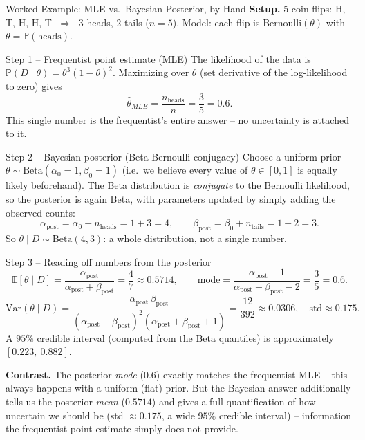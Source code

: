 \documentclass[aspectratio=169,10pt]{beamer}
\begin{document}
\begin{frame}[allowframebreaks]{Worked Example: MLE vs.\ Bayesian Posterior, by Hand}
  \textbf{Setup.} 5 coin flips: H, T, H, H, T $\;\Rightarrow\;$ 3 heads, 2
  tails ($n=5$). Model: each flip is Bernoulli$(\theta)$ with
  $\theta = \mathbb{P}(\text{heads})$.

  \begin{block}{Step 1 -- Frequentist point estimate (MLE)}
    The likelihood of the data is
    $\mathbb{P}(D\mid\theta) = \theta^{3}(1-\theta)^{2}$.
    Maximizing over $\theta$ (set derivative of the log-likelihood to zero)
    gives
    \[
      \hat\theta_{MLE} = \frac{n_{\text{heads}}}{n} = \frac{3}{5} = 0.6 .
    \]
    This single number is the frequentist's entire answer -- no uncertainty
    is attached to it.
  \end{block}

  \framebreak

  \begin{block}{Step 2 -- Bayesian posterior (Beta-Bernoulli conjugacy)}
    Choose a uniform prior $\theta \sim \text{Beta}(\alpha_0{=}1,\beta_0{=}1)$
    (i.e.\ we believe every value of $\theta \in [0,1]$ is equally likely
    beforehand). The Beta distribution is \emph{conjugate} to the Bernoulli
    likelihood, so the posterior is again Beta, with parameters updated by
    simply adding the observed counts:
    \[
      \alpha_{\text{post}} = \alpha_0 + n_{\text{heads}} = 1 + 3 = 4, \qquad
      \beta_{\text{post}} = \beta_0 + n_{\text{tails}} = 1 + 2 = 3 .
    \]
    So $\theta \mid D \sim \text{Beta}(4,3)$: a whole distribution, not a
    single number.
  \end{block}

  \framebreak

  \begin{block}{Step 3 -- Reading off numbers from the posterior}
    \[
      \mathbb{E}[\theta\mid D] = \frac{\alpha_{\text{post}}}{\alpha_{\text{post}}+\beta_{\text{post}}}
      = \frac{4}{7} \approx 0.5714, \qquad
      \text{mode} = \frac{\alpha_{\text{post}}-1}{\alpha_{\text{post}}+\beta_{\text{post}}-2}
      = \frac{3}{5} = 0.6 .
    \]
    \[
      \text{Var}(\theta\mid D) = \frac{\alpha_{\text{post}}\,\beta_{\text{post}}}
        {(\alpha_{\text{post}}+\beta_{\text{post}})^2(\alpha_{\text{post}}+\beta_{\text{post}}+1)}
      = \frac{12}{392} \approx 0.0306, \quad \text{std} \approx 0.175 .
    \]
    A $95\%$ credible interval (computed from the Beta quantiles) is
    approximately $[0.223,\ 0.882]$.
  \end{block}

  \textbf{Contrast.} The posterior \emph{mode} ($0.6$) exactly matches the
  frequentist MLE -- this always happens with a uniform (flat) prior. But
  the Bayesian answer additionally tells us the posterior \emph{mean}
  ($0.5714$) and gives a full quantification of how uncertain we should be
  (std $\approx 0.175$, a wide $95\%$ credible interval) -- information the
  frequentist point estimate simply does not provide.
\end{frame}
\end{document}
